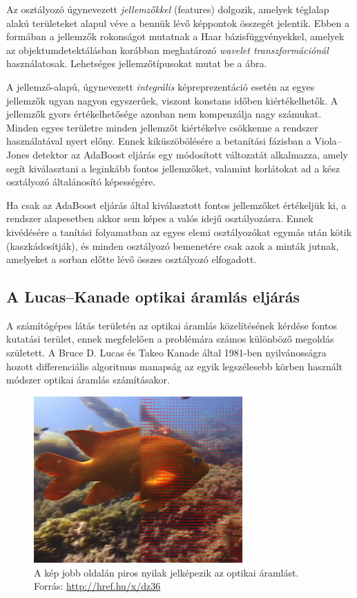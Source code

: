 Az osztályozó úgynevezett \emph{jellemzőkkel} (features) dolgozik, amelyek téglalap alakú területeket alapul véve a bennük lévő képpontok összegét jelentik. Ebben a formában a jellemzők rokonságot mutatnak a Haar bázisfüggvényekkel, amelyek az objektumdetektálásban korábban meghatározó \emph{wavelet transzformációnál} használatosak. Lehetséges jellemzőtípusokat mutat be a  ábra.

A jellemző-alapú, úgynevezett \emph{integrális} képreprezentáció esetén az egyes jellemzők ugyan nagyon egyszerűek, viszont konstans időben kiértékelhetők. A jellemzők gyors értékelhetősége azonban nem kompenzálja nagy számukat. Minden egyes területre minden jellemzőt kiértékelve csökkenne a rendszer használatával nyert előny. Ennek kiküszöbölésére a betanítási fázisban a Viola--Jones detektor az AdaBoost \cite{freund} eljárás egy módosított változatát alkalmazza, amely segít kiválasztani a leginkább fontos jellemzőket, valamint korlátokat ad a kész osztályozó általánosító képességére.

Ha csak az AdaBoost eljárás által kiválasztott fontos jellemzőket értékeljük ki, a rendszer alapesetben akkor sem képes a valós idejű osztályozásra. Ennek kivédésére a tanítási folyamatban az egyes elemi osztályozókat egymás után kötik (kaszkádosítják), és minden osztályozó bemenetére csak azok a minták jutnak, amelyeket a sorban előtte lévő összes osztályozó elfogadott.

\subsection{A Lucas--Kanade optikai áramlás eljárás}\label{sect:optflow}

A számítógépes látás területén az optikai áramlás közelítésének kérdése fontos kutatási terület, ennek megfelelően a problémára számos különböző megoldás született. A Bruce D. Lucas és Takeo Kanade által 1981-ben nyilvánosságra hozott \cite{lk} differenciális algoritmus manapság az egyik legszélesebb körben használt módszer optikai áramlás számításakor.

\begin{figure}[!ht]
\centering
\includegraphics[width=80mm, keepaspectratio]{figures/opticalflow.png}
\caption{A kép jobb oldalán piros nyilak jelképezik az optikai áramlást.\\Forrás: \url{http://href.hu/x/dz36}}
\label{fig:optical_flow}
\end{figure}

